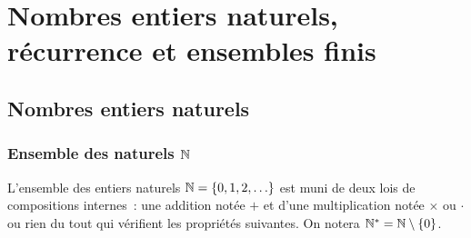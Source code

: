 \chapter{Nombres entiers naturels, récurrence et ensembles finis}
\minitoc
\minilof
\minilot
\label{chap:naturels}
\section{Nombres entiers naturels}

\subsection{Ensemble des naturels $\mathbb{N}$}

L'ensemble des entiers naturels $\mathbb{N}=\{0,1,2,\ldots\}$ est muni de deux lois de compositions internes~: une addition notée $+$ et d'une multiplication notée $\times$ ou $\cdot$ ou rien du tout qui vérifient les propriétés suivantes. On notera $\mathbb{N}^*=\mathbb{N}\setminus\{0\}$.

